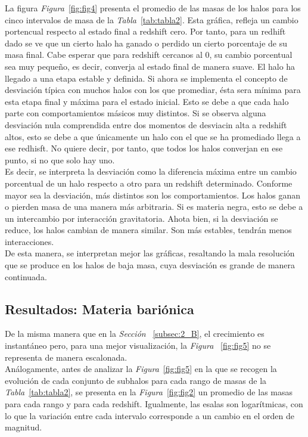 La figura \textit{Figura}~\ref{fig:fig4} presenta el promedio de las masas de los halos para los cinco intervalos de masa de la \textit{Tabla}~\ref{tab:tabla2}. Esta gráfica, refleja un cambio portencual respecto al estado final a redshift cero. Por tanto, para un redhift dado se ve que un cierto halo ha ganado o perdido un cierto porcentaje de su masa final. Cabe esperar que para redshift cercanos al 0, su cambio porcentual sea muy pequeño, es decir, converja al estado final de manera suave. El halo ha llegado a una etapa estable y definida. Si ahora se implementa el concepto de desviación típica con muchos halos con los que promediar, ésta sera mínima para esta etapa final y máxima para el estado inicial. Esto se debe a que cada halo parte con comportamientos másicos muy distintos. Si se observa alguna desviación nula comprendida entre dos momentos de desviacin alta a redshift altos, esto se debe a que únicamente un halo con el que se ha promediado llega a ese redhisft. No quiere decir, por tanto, que todos los halos converjan en ese punto, si no que solo hay uno. \\

Es decir, se interpreta la desviación como la diferencia máxima entre un cambio porcentual de un halo respecto a otro para un redshift determinado. Conforme mayor sea la desviación, más distintos son los comportamientos. Los halos ganan o pierden masa de una manera más arbitraria. Si es materia negra, esto se debe a un intercambio por interacción gravitatoria. Ahota bien, si la desviación se reduce, los halos cambian de manera similar. Son más estables, tendrán menos interacciones. \\

De esta manera, se interpretan mejor las gráficas, resaltando la mala resolución que se produce en los halos de baja masa, cuya desviación es grande de manera continuada. 

\subsection{Resultados: Materia bariónica}
\label{subsec:2_C}

De la misma manera que en la \textit{Sección} ~\ref{subsec:2_B}, el crecimiento es instantáneo pero, para una mejor visualización, la \textit{Figura} ~\ref{fig:fig5} no se representa de manera escalonada. \\

Análogamente, antes de analizar la \textit{Figura}~\ref{fig:fig5} en la que se recogen la evolución de cada conjunto de subhalos para cada rango de masas de la \textit{Tabla}~\ref{tab:tabla2}, se presenta en la \textit{Figura}~\ref{fig:fig2} un promedio de las masas para cada rango y para cada redshift. Igualmente, las esalas son logarítmicas, con lo que la variación entre cada intervalo corresponde a un cambio en el orden de magnitud. \\

